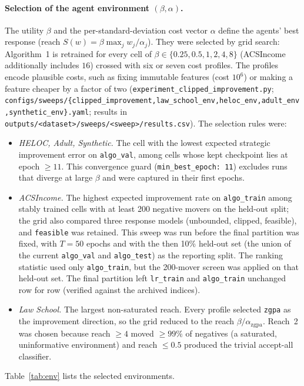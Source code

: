 \paragraph{Selection of the agent environment $(\beta,\alpha)$.}
The utility $\beta$ and the per-standard-deviation cost vector $\alpha$ define
the agents' best response (reach $S(w)=\beta\max_j w_j/\alpha_j$). They were
selected by grid search: Algorithm~1 is retrained for every cell of
$\beta\in\{0.25,0.5,1,2,4,8\}$ (ACSIncome additionally includes $16$) crossed
with six or seven cost profiles. The profiles encode plausible costs, such as
fixing immutable features (cost $10^{6}$) or making a feature cheaper by a
factor of two
(\texttt{experiment\_clipped\_improvement.py};
\texttt{configs/sweeps/\{clipped\_improvement,law\_school\_env,heloc\_env,adult\_env,synthetic\_env\}.yaml};
results in \texttt{outputs/<dataset>/sweeps/<sweep>/results.csv}).
The selection rules were:
\begin{itemize}
  \item \emph{HELOC, Adult, Synthetic.} The cell with the lowest expected
        strategic improvement error on \texttt{algo\_val}, among cells whose
        kept checkpoint lies at epoch $\ge 11$. This convergence guard
        (\texttt{min\_best\_epoch: 11}) excludes runs that diverge at large
        $\beta$ and were captured in their first epochs.
  \item \emph{ACSIncome.} The highest expected improvement rate on
        \texttt{algo\_train} among stably trained cells with at least 200
        negative movers on the held-out split; the grid also compared three
        response models (unbounded, clipped, feasible), and \texttt{feasible}
        was retained. This sweep was run before the final partition was fixed,
        with $T=50$ epochs and with the then 10\% held-out set (the union of
        the current \texttt{algo\_val} and \texttt{algo\_test}) as the
        reporting split. The ranking statistic used only \texttt{algo\_train},
        but the 200-mover screen was applied on that held-out set. The final
        partition left \texttt{lr\_train} and \texttt{algo\_train} unchanged
        row for row (verified against the archived indices).
  \item \emph{Law School.} The largest non-saturated reach. Every profile
        selected \texttt{zgpa} as the improvement direction, so the grid
        reduced to the reach $\beta/\alpha_{\mathrm{zgpa}}$. Reach~2 was chosen
        because reach $\ge 4$ moved $\ge 99\%$ of negatives (a saturated,
        uninformative environment) and reach $\le 0.5$ produced the trivial
        accept-all classifier.
\end{itemize}
Table~\ref{tab:env} lists the selected environments.


